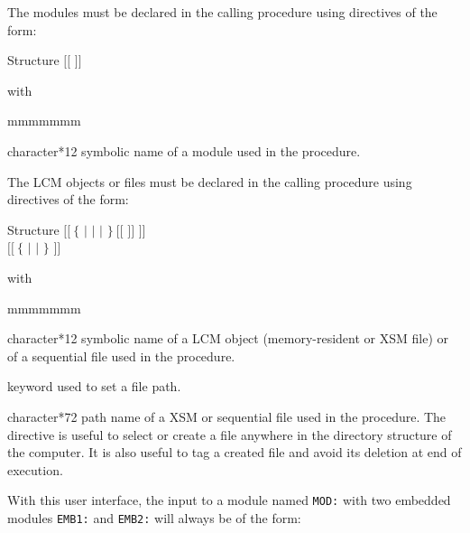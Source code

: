 The modules must be declared in the calling procedure using directives of the form:

\begin{DataStructure}{Structure }
 $[[$  $]]$ \moc{;} \\
\end{DataStructure}
\noindent with

\begin{ListeDeDescription}{mmmmmmm}

\item[\dusa{name}] character*12 symbolic name of a module used in the procedure.

\end{ListeDeDescription}

\vskip 0.4cm
\goodbreak

The LCM objects or files must be declared in the calling procedure using directives of the form:

\begin{DataStructure}{Structure }
$[[~\{$  $|$  $|$  $|$  $\}~[[$  $]]$ \moc{;} $]]$ \\
$[[~\{$  $|$  $|$  $\}$  \moc{::}   \moc{;} $]]$
\end{DataStructure}
\noindent with

\begin{ListeDeDescription}{mmmmmmm}

\item[\dusa{name}] character*12 symbolic name of a LCM object (memory-resident or XSM file) or of a sequential file used in the procedure.

\item[\moc{FILE}] keyword used to set a file path.

\item[\dusa{path}] character*72 path name of a XSM or sequential file used in the procedure. The  directive is useful to select or
create a file anywhere in the directory structure of the computer. It is also useful to tag a created file and avoid its deletion at end of
execution.

\end{ListeDeDescription}

\vskip 0.4cm

With this user interface, the input to a module named {\tt MOD:} with two
embedded modules {\tt EMB1:} and {\tt EMB2:} will always be of the form:

